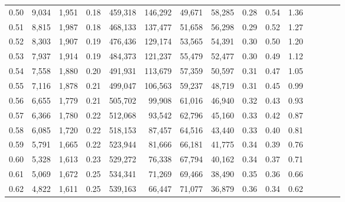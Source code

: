 \begin{tabular}{rrrcrrrrrrrrrrr}
0.50 &   9,034 &  1,951 &                                       0.18 &  459,318 &  146,292 &   49,671 &   58,285 &  0.28 &  0.54 &                         1.36 \\
0.51 &   8,815 &  1,987 &                                       0.18 &  468,133 &  137,477 &   51,658 &   56,298 &  0.29 &  0.52 &                         1.27 \\
0.52 &   8,303 &  1,907 &                                       0.19 &  476,436 &  129,174 &   53,565 &   54,391 &  0.30 &  0.50 &                         1.20 \\
0.53 &   7,937 &  1,914 &                                       0.19 &  484,373 &  121,237 &   55,479 &   52,477 &  0.30 &  0.49 &                         1.12 \\
0.54 &   7,558 &  1,880 &                                       0.20 &  491,931 &  113,679 &   57,359 &   50,597 &  0.31 &  0.47 &                         1.05 \\
0.55 &   7,116 &  1,878 &                                       0.21 &  499,047 &  106,563 &   59,237 &   48,719 &  0.31 &  0.45 &                         0.99 \\
0.56 &   6,655 &  1,779 &                                       0.21 &  505,702 &   99,908 &   61,016 &   46,940 &  0.32 &  0.43 &                         0.93 \\
0.57 &   6,366 &  1,780 &                                       0.22 &  512,068 &   93,542 &   62,796 &   45,160 &  0.33 &  0.42 &                         0.87 \\
0.58 &   6,085 &  1,720 &                                       0.22 &  518,153 &   87,457 &   64,516 &   43,440 &  0.33 &  0.40 &                         0.81 \\
0.59 &   5,791 &  1,665 &                                       0.22 &  523,944 &   81,666 &   66,181 &   41,775 &  0.34 &  0.39 &                         0.76 \\
0.60 &   5,328 &  1,613 &                                       0.23 &  529,272 &   76,338 &   67,794 &   40,162 &  0.34 &  0.37 &                         0.71 \\
0.61 &   5,069 &  1,672 &                                       0.25 &  534,341 &   71,269 &   69,466 &   38,490 &  0.35 &  0.36 &                         0.66 \\
0.62 &   4,822 &  1,611 &                                       0.25 &  539,163 &   66,447 &   71,077 &   36,879 &  0.36 &  0.34 &                         0.62 \\

\end{tabular}
